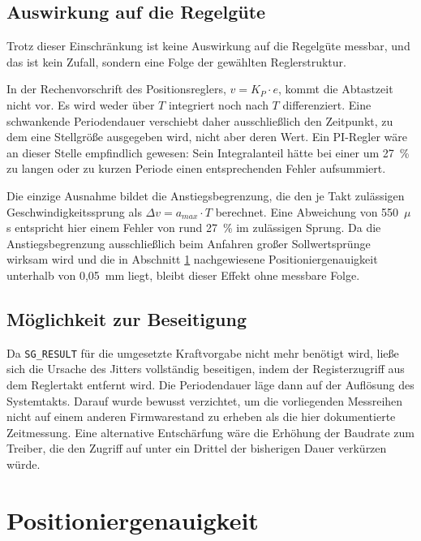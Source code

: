 \subsection*{Auswirkung auf die Regelgüte}

Trotz dieser Einschränkung ist keine Auswirkung auf die Regelgüte messbar, und das ist
kein Zufall, sondern eine Folge der gewählten Reglerstruktur.

In der Rechenvorschrift des Positionsreglers, $v = K_P \cdot e$, kommt die Abtastzeit
nicht vor. Es wird weder über $T$ integriert noch nach $T$ differenziert. Eine
schwankende Periodendauer verschiebt daher ausschließlich den Zeitpunkt, zu dem eine
Stellgröße ausgegeben wird, nicht aber deren Wert. Ein PI-Regler wäre an dieser Stelle
empfindlich gewesen: Sein Integralanteil hätte bei einer um 27~\% zu langen oder zu
kurzen Periode einen entsprechenden Fehler aufsummiert.

Die einzige Ausnahme bildet die Anstiegsbegrenzung, die den je Takt zulässigen
Geschwindigkeitssprung als $\Delta v = a_{max} \cdot T$ berechnet. Eine Abweichung von
550~$\mu$s entspricht hier einem Fehler von rund 27~\% im zulässigen Sprung. Da die
Anstiegsbegrenzung ausschließlich beim Anfahren großer Sollwertsprünge wirksam wird und
die in Abschnitt \ref{sec:ergebnis_position} nachgewiesene Positioniergenauigkeit
unterhalb von 0,05~mm liegt, bleibt dieser Effekt ohne messbare Folge.

\subsection*{Möglichkeit zur Beseitigung}

Da \texttt{SG\_RESULT} für die umgesetzte Kraftvorgabe nicht mehr benötigt wird, ließe
sich die Ursache des Jitters vollständig beseitigen, indem der Registerzugriff aus dem
Reglertakt entfernt wird. Die Periodendauer läge dann auf der Auflösung des Systemtakts.
Darauf wurde bewusst verzichtet, um die vorliegenden Messreihen nicht auf einem anderen
Firmwarestand zu erheben als die hier dokumentierte Zeitmessung. Eine alternative
Entschärfung wäre die Erhöhung der Baudrate zum Treiber, die den Zugriff auf unter ein
Drittel der bisherigen Dauer verkürzen würde.

\section{Positioniergenauigkeit}
\label{sec:ergebnis_position}

